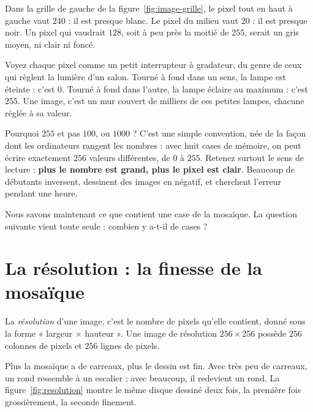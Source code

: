 \begin{exemple}
Dans la grille de gauche de la figure~\ref{fig:image-grille}, le pixel tout en haut
à gauche vaut $240$ : il est presque blanc. Le pixel du milieu vaut $20$ :
il est presque noir. Un pixel qui vaudrait $128$, soit à peu près la
moitié de $255$, serait un gris moyen, ni clair ni foncé.
\end{exemple}

\begin{intuition}
Voyez chaque pixel comme un petit interrupteur à gradateur, du genre de
ceux qui règlent la lumière d'un salon. Tourné à fond dans un sens, la
lampe est éteinte : c'est $0$. Tourné à fond dans l'autre, la lampe éclaire
au maximum : c'est $255$. Une image, c'est un mur couvert de milliers de
ces petites lampes, chacune réglée à sa valeur.
\end{intuition}

\begin{piege}
Pourquoi $255$ et pas $100$, ou $1000$ ? C'est une simple convention, née
de la façon dont les ordinateurs rangent les nombres : avec huit cases de
mémoire, on peut écrire exactement $256$ valeurs différentes, de $0$ à
$255$. Retenez surtout le sens de lecture : \textbf{plus le nombre est
grand, plus le pixel est clair}. Beaucoup de débutants inversent, dessinent
des images en négatif, et cherchent l'erreur pendant une heure.
\end{piege}

Nous savons maintenant ce que contient une case de la mosaïque. La question
suivante vient toute seule : combien y a-t-il de cases ?

\section{La résolution : la finesse de la mosaïque}

\begin{definition}[La résolution][resolution]
La \emph{résolution} d'une image, c'est le nombre de pixels qu'elle
contient, donné sous la forme « largeur $\times$ hauteur ». Une image de
résolution $256 \times 256$ possède $256$ colonnes de pixels et $256$
lignes de pixels.
\end{definition}

Plus la mosaïque a de carreaux, plus le dessin est fin. Avec très peu de
carreaux, un rond ressemble à un escalier ; avec beaucoup, il redevient un
rond. La figure~\ref{fig:resolution} montre le même disque dessiné deux fois, la
première fois grossièrement, la seconde finement.

